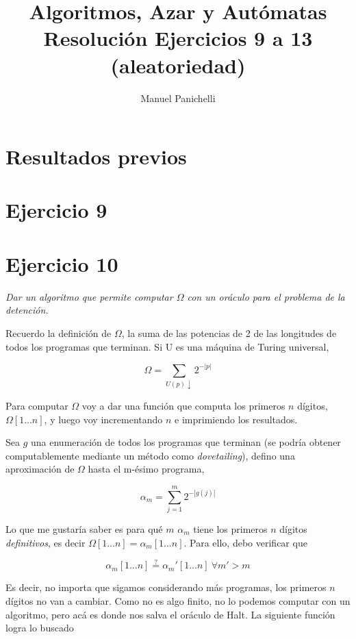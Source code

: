 \documentclass{article}
\author{Manuel Panichelli}
\title{Algoritmos, Azar y Autómatas\\Resolución Ejercicios 9 a 13 (aleatoriedad)}
\theoremstyle{definition} %
\newcommand{\progends}{\downarrow}
\newcommand{\firstn}[1]{#1[1 \dots n]}
\begin{document}
\maketitle

\section*{Resultados previos}

\newpage

\section*{Ejercicio 9}

\newpage

\section*{Ejercicio 10}

\textit{Dar un algoritmo que permite computar $\Omega$ con un oráculo para el problema de la detención.}

Recuerdo la definición de $\Omega$, la suma de las potencias de 2 de las
longitudes de todos los programas que terminan. Si U es una máquina de Turing
universal,

\[
    \Omega = \sum_{U(p)\progends} 2 ^ {-|p|}
\]

Para computar $\Omega$ voy a dar una función que computa los primeros $n$
dígitos, $\firstn{\Omega}$, y luego voy incrementando $n$ e imprimiendo los
resultados.

Sea $g$ una enumeración de todos los programas que terminan (se
podría obtener computablemente mediante un método como \textit{dovetailing}),
defino una aproximación de $\Omega$ hasta el m-ésimo programa,

\[
    \alpha_m = \sum_{j = 1}^{m} 2 ^ {-|g(j)|}
\]

Lo que me gustaría saber es para qué $m$ $\alpha_m$ tiene los primeros $n$
dígitos \textit{definitivos}, es decir $\firstn{\Omega} = \firstn{\alpha_m}$.
Para ello, debo verificar que

\[
    \firstn{\alpha_m} \overset{?}{=} \firstn{\alpha_m'}\ \forall m' > m
\]

Es decir, no importa que sigamos considerando más programas, los primeros $n$
dígitos no van a cambiar. Como no es algo finito, no lo podemos computar con un
algoritmo, pero acá es donde nos salva el oráculo de Halt. La siguiente función
logra lo buscado
\end{document}
